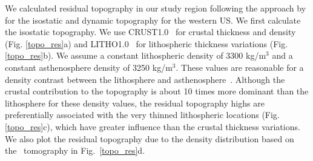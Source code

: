 \documentclass[draft,linenumbers]{agujournal2018}
\begin{document}
We calculated residual topography in our study region following the approach by \citet{becker2014static} for the isostatic and dynamic topography for the western US. We first calculate the isostatic topography. We use CRUST1.0~\citep{laske2013update} for crustal thickness and density (Fig. \ref{topo_res}a) and LITHO1.0~\citep{pasyanos2014litho1} for lithospheric thickness variations (Fig. \ref{topo_res}b). We assume a constant lithospheric density of 3300 kg/m$^3$ and a constant asthenosphere density of 3250 kg/m$^3$. These values are reasonable for a density contrast between the lithosphere and asthenosphere~\citep[e.g.,][]{bonnardot2008numerical, ito2011probing}. Although the crustal contribution to the topography is about 10 times more dominant than the lithosphere for these density values, the residual topography highs are preferentially associated with the very thinned lithospheric locations (Fig. \ref{topo_res}c), which have greater influence than the crustal thickness variations. We also plot the residual topography due to the density distribution based on the~\citet{Biryol_2016} tomography in Fig.~\ref{topo_res}d. 
%   
\end{document}

